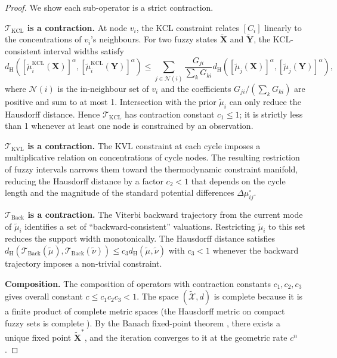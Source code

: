\documentclass[twocolumn,10pt]{article}
\theoremstyle{remark}
\newcommand{\fuzzy}[1]{\tilde{#1}}
\newcommand{\fuzzyset}[1]{\tilde{\mu}_{#1}}
\newcommand{\hausd}{d_{\mathrm{H}}}
\newcommand{\Tkcl}{\mathcal{T}_{\mathrm{KCL}}}
\newcommand{\Tkvl}{\mathcal{T}_{\mathrm{KVL}}}
\newcommand{\Tback}{\mathcal{T}_{\mathrm{Back}}}
\begin{document}
\begin{proof}
We show each sub-operator is a strict contraction.

\textbf{$\Tkcl$ is a contraction.}  At node $v_i$, the KCL constraint relates $[C_i]$ linearly to the concentrations of $v_i$'s neighbours.  For two fuzzy states $\fuzzy{\mathbf{X}}$ and $\fuzzy{\mathbf{Y}}$, the KCL-consistent interval widths satisfy
\begin{equation}
    \hausd\!\left([\fuzzyset{i}^{\text{KCL}}(\mathbf{X})]^\alpha, [\fuzzyset{i}^{\text{KCL}}(\mathbf{Y})]^\alpha\right) \leq \sum_{j \in \mathcal{N}(i)} \frac{G_{ji}}{\sum_k G_{ki}} \hausd\!\left([\fuzzyset{j}(\mathbf{X})]^\alpha, [\fuzzyset{j}(\mathbf{Y})]^\alpha\right),
\end{equation}
where $\mathcal{N}(i)$ is the in-neighbour set of $v_i$ and the coefficients $G_{ji}/(\sum_k G_{ki})$ are positive and sum to at most 1.  Intersection with the prior $\fuzzyset{i}$ can only reduce the Hausdorff distance.  Hence $\Tkcl$ has contraction constant $c_1 \leq 1$; it is strictly less than 1 whenever at least one node is constrained by an observation.

\textbf{$\Tkvl$ is a contraction.}  The KVL constraint at each cycle imposes a multiplicative relation on concentrations of cycle nodes.  The resulting restriction of fuzzy intervals narrows them toward the thermodynamic constraint manifold, reducing the Hausdorff distance by a factor $c_2 < 1$ that depends on the cycle length and the magnitude of the standard potential differences $\Delta\mu_{ij}^\circ$.

\textbf{$\Tback$ is a contraction.}  The Viterbi backward trajectory from the current mode of $\fuzzyset{i}$ identifies a set of ``backward-consistent'' valuations.  Restricting $\fuzzyset{i}$ to this set reduces the support width monotonically.  The Hausdorff distance satisfies $\hausd(\Tback(\fuzzyset{}), \Tback(\tilde{\nu})) \leq c_3 \hausd(\fuzzyset{}, \tilde{\nu})$ with $c_3 < 1$ whenever the backward trajectory imposes a non-trivial constraint.

\textbf{Composition.}  The composition of operators with contraction constants $c_1, c_2, c_3$ gives overall constant $c \leq c_1 c_2 c_3 < 1$.  The space $(\tilde{\mathcal{X}}, d)$ is complete because it is a finite product of complete metric spaces (the Hausdorff metric on compact fuzzy sets is complete \cite{hausdorff1914}).  By the Banach fixed-point theorem \cite{banach1922}, there exists a unique fixed point $\fuzzy{\mathbf{X}}^*$, and the iteration converges to it at the geometric rate $c^n$.
\end{proof}
\end{document}
